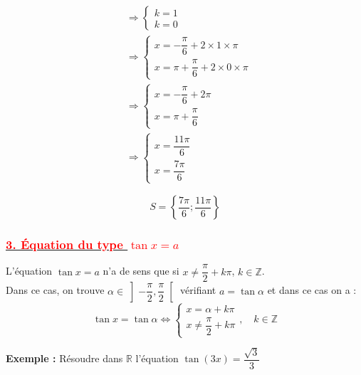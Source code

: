 \documentclass[a4paper,12pt]{article}
\begin{document}
\[\begin{aligned}
                                & \Rightarrow
        \begin{cases}
            k=1 \\[1em]
            k=0
        \end{cases}                                  \\[1em]
                                & \Rightarrow
        \begin{cases}
            x = -\dfrac{\pi}{6} + 2\times 1 \times\pi \\
            x = \pi + \dfrac{\pi}{6} + 2\times 0 \times\pi
        \end{cases} \\[1em]
                                & \Rightarrow
        \begin{cases}
            x = -\dfrac{\pi}{6} + 2\pi \\
            x = \pi + \dfrac{\pi}{6}
        \end{cases}                    \\[1em]
                                & \Rightarrow
        \begin{cases}
            x = \dfrac{11\pi}{6} \\[1em]
            x = \dfrac{7\pi}{6}
        \end{cases}
    \end{aligned}
\]

\[
    \boxed{S = \left\{\dfrac{7\pi}{6}; \dfrac{11\pi}{6} \right\}}
\]

\subsubsection*{\underline{\textcolor{red}{3. Équation du type $\tan x = a$}}}

\noindent
L'équation $\tan x = a$ n'a de sens que si $x \neq \dfrac{\pi}{2} + k\pi$, $k \in \mathbb{Z}$.\\

\noindent
Dans ce cas, on trouve $\alpha \in \left]-\dfrac{\pi}{2}, \dfrac{\pi}{2}\right[$ vérifiant $a = \tan \alpha$ et dans ce cas on a :
            \[
                \tan x = \tan \alpha \Leftrightarrow
                \begin{cases}
                    x = \alpha + k\pi \\
                    x \neq \dfrac{\pi}{2} + k\pi
                \end{cases},\quad k \in \mathbb{Z}
            \]

            \noindent\textbf{Exemple :} Résoudre dans \( \mathbb{R} \) l'équation \( \tan(3x) = \dfrac{\sqrt{3}}{3} \)
\end{document}
